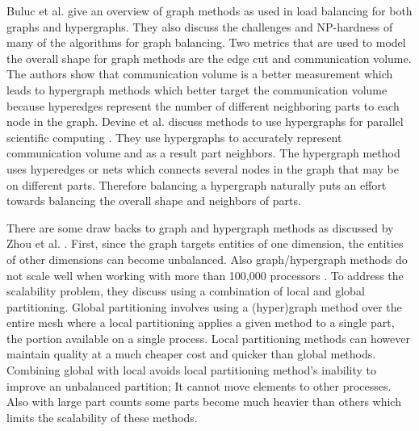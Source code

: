 \documentclass{thesis}
\begin{document}
Buluc et al. \cite{surveygraph} give an overview of graph methods as used in 
load balancing 
for both graphs and hypergraphs. They also discuss the challenges and 
NP-hardness of many of the algorithms for graph balancing. Two metrics that 
are used to model the overall shape for graph methods are the edge cut and 
communication volume. The authors show that communication volume is a better 
measurement which leads to hypergraph methods which better target the 
communication volume because hyperedges represent the number of different 
neighboring parts to each node in the graph. Devine et al. discuss methods 
to use hypergraphs for parallel scientific computing \cite{hypergraph}. They
use hypergraphs to accurately represent communication volume and as a result
part neighbors. The hypergraph method uses hyperedges or nets which connects 
several nodes in the graph that may be on different parts. Therefore 
balancing a hypergraph naturally puts an effort towards balancing the overall
shape and neighbors of parts. 

There are some draw backs to graph and hypergraph methods as discussed 
by Zhou et al. \cite{zhougraph}. First, since the graph targets 
entities of one dimension, the entities of other dimensions can become 
unbalanced. Also graph/hypergraph methods do not scale well when working with 
more than 100,000 processors \cite{zhougraph}. To address the scalability 
problem, they discuss using a combination of local and global partitioning. 
Global partitioning involves using a (hyper)graph method over the entire mesh 
where a local partitioning applies a given method to a single part, the 
portion available on a single process. Local partitioning methods can however 
maintain quality at a much cheaper cost and quicker than global methods. 
Combining global with local avoids local partitioning method's inability 
to improve an unbalanced partition; It cannot move elements to other processes. 
Also with large part counts some parts become much heavier than others which 
limits the scalability of these methods.
\end{document}
